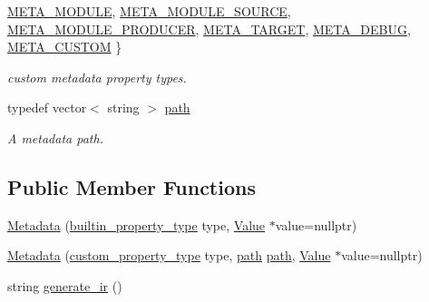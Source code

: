 \begin{DoxyCompactItemize}
\hyperlink{classevir_1_1Metadata_a6ccc55dee8a150a9917bc1204fdf4c3aa2e301f0107d9eeec9b89cbe651b938c9}{M\+E\+T\+A\+\_\+\+M\+O\+D\+U\+LE}, 
\newline
\hyperlink{classevir_1_1Metadata_a6ccc55dee8a150a9917bc1204fdf4c3aa0573f0d1ed472f569a560896ac2f3191}{M\+E\+T\+A\+\_\+\+M\+O\+D\+U\+L\+E\+\_\+\+S\+O\+U\+R\+CE}, 
\newline
\hyperlink{classevir_1_1Metadata_a6ccc55dee8a150a9917bc1204fdf4c3aae87fa9c17efc349460ad189c7befda31}{M\+E\+T\+A\+\_\+\+M\+O\+D\+U\+L\+E\+\_\+\+P\+R\+O\+D\+U\+C\+ER}, 
\newline
\hyperlink{classevir_1_1Metadata_a6ccc55dee8a150a9917bc1204fdf4c3aae95c2f2abaeccace9798c006d8a46cef}{M\+E\+T\+A\+\_\+\+T\+A\+R\+G\+ET}, 
\newline
\hyperlink{classevir_1_1Metadata_a6ccc55dee8a150a9917bc1204fdf4c3aaaf1fc29999b24aab0e1b44f45a7e08b9}{M\+E\+T\+A\+\_\+\+D\+E\+B\+UG}, 
\newline
\hyperlink{classevir_1_1Metadata_a6ccc55dee8a150a9917bc1204fdf4c3aacf006a02fadcd158c073c8d75627569c}{M\+E\+T\+A\+\_\+\+C\+U\+S\+T\+OM}
 \}\begin{DoxyCompactList}\small\item\em custom metadata property types. \end{DoxyCompactList}
\item 
\mbox{\label{classevir_1_1Metadata_a0a3a8f0c937238fae5262283bac6286a}} 
typedef vector$<$ string $>$ \hyperlink{classevir_1_1Metadata_a0a3a8f0c937238fae5262283bac6286a}{path}
\begin{DoxyCompactList}\small\item\em A metadata path. \end{DoxyCompactList}\end{DoxyCompactItemize}
\subsection*{Public Member Functions}
\begin{DoxyCompactItemize}
\item 
\hyperlink{classevir_1_1Metadata_ad16e0a606fc5daa81fc505633aab9c90}{Metadata} (\hyperlink{classevir_1_1Metadata_a292423b7a2d93f70382d1da4929f55a0}{builtin\+\_\+property\+\_\+type} type, \hyperlink{classevir_1_1Value}{Value} $\ast$value=nullptr)
\item 
\hyperlink{classevir_1_1Metadata_a6f3e02e9cfe01368e1f8eba1947de4e6}{Metadata} (\hyperlink{classevir_1_1Metadata_a6ccc55dee8a150a9917bc1204fdf4c3a}{custom\+\_\+property\+\_\+type} type, \hyperlink{classevir_1_1Metadata_a0a3a8f0c937238fae5262283bac6286a}{path} \hyperlink{classevir_1_1Metadata_a0a3a8f0c937238fae5262283bac6286a}{path}, \hyperlink{classevir_1_1Value}{Value} $\ast$value=nullptr)
\item 
string \hyperlink{classevir_1_1Metadata_a4fe174d10ee934c0eb531f38bbb8b4df}{generate\+\_\+ir} ()
\end{DoxyCompactItemize}
